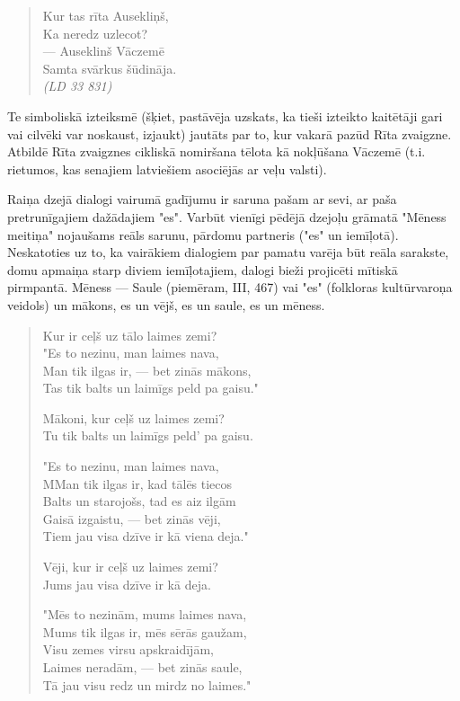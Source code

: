 \documentclass[11pt]{article}
\begin{document}
{\color{red}
\begin{quote}
Kur tas rīta Ausekliņš,\\
Ka neredz uzlecot?\\
--- Auseklinš Vāczemē\\
Samta svārkus šūdināja.\\
{\em (LD 33 831)}
\end{quote}

Te simboliskā izteiksmē (šķiet, pastāvēja uzskats, ka
tieši izteikto kaitētāji gari vai cilvēki var
noskaust, izjaukt) jautāts par to, kur vakarā pazūd
Rīta zvaigzne. Atbildē Rīta zvaigznes cikliskā
nomiršana tēlota kā nokļūšana Vāczemē (t.i. rietumos,
kas senajiem latviešiem asociējās ar veļu valsti).

Raiņa dzejā dialogi vairumā gadījumu ir saruna pašam
ar sevi, ar paša pretrunīgajiem dažādajiem "es".
Varbūt vienīgi pēdējā dzejoļu grāmatā "Mēness meitiņa"
nojaušams reāls sarunu, pārdomu partneris ("es" un
iemīļotā). Neskatoties uz to, ka vairākiem dialogiem
par pamatu varēja būt reāla sarakste, domu apmaiņa
starp diviem iemīļotajiem, dalogi bieži projicēti
mītiskā pirmpantā. Mēness --- Saule (piemēram,
III, 467) vai "es" (folkloras kultūrvaroņa
veidols) un mākons, es un vējš, es un saule, es un
mēness.

\begin{quote}
Kur ir ceļš uz tālo laimes zemi?\\
"Es to nezinu, man laimes nava,\\
Man tik ilgas ir, --- bet zinās mākons,\\
Tas tik balts un laimīgs peld pa gaisu."

Mākoni, kur ceļš uz laimes zemi?\\
Tu tik balts un laimīgs peld' pa gaisu.

"Es to nezinu, man laimes nava,\\
MMan tik ilgas ir, kad tālēs tiecos\\
Balts un starojošs, tad es aiz ilgām\\
Gaisā izgaistu, --- bet zinās vēji,\\
Tiem jau visa dzīve ir kā viena deja."

Vēji, kur ir ceļš uz laimes zemi?\\
Jums jau visa dzīve ir kā deja.

"Mēs to nezinām, mums laimes nava,\\
Mums tik ilgas ir, mēs sērās gaužam,\\
Visu zemes virsu apskraidījām,\\
Laimes neradām, --- bet zinās saule,\\
Tā jau visu redz un mirdz no laimes."


\end{quote}}
\end{document}
